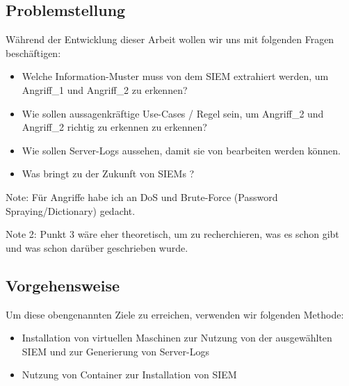 \subsection{Problemstellung}
Während der Entwicklung dieser Arbeit wollen wir uns mit folgenden Fragen beschäftigen:

\begin{itemize}
   \item Welche Information-Muster muss von dem \gls{SIEM} extrahiert werden, um Angriff\_1 und Angriff\_2 zu erkennen?
   \item Wie sollen aussagenkräftige Use-Cases / Regel sein, um Angriff\_2 und Angriff\_2 richtig zu erkennen zu erkennen?
   \item Wie sollen Server-Logs aussehen, damit sie von  bearbeiten werden können.
   \item Was bringt  zu der Zukunft von \glspl{SIEM} ?
\end{itemize}

Note: Für Angriffe habe ich an DoS und Brute-Force (Password Spraying/Dictionary) gedacht.

Note 2: Punkt 3 wäre eher theoretisch, um zu recherchieren, was es schon gibt und was schon darüber geschrieben wurde.

\subsection{Vorgehensweise}
Um diese obengenannten Ziele zu erreichen, verwenden wir folgenden Methode:

\begin{itemize}[noitemsep]
   \item Installation von virtuellen Maschinen zur Nutzung von der ausgewählten \gls{SIEM} und zur Generierung von Server-Logs
   \item Nutzung von Container zur Installation von \gls{SIEM}
\end{itemize}


